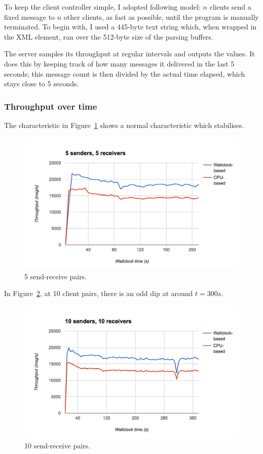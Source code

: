 To keep the client controller simple, I adopted following model: $n$ clients send a fixed message to $n$ other clients, as fast as possible, until the program is manually terminated. To begin with, I used a 445-byte text string which, when wrapped in the XML  element, ran over the 512-byte size of the parsing buffers.

The server samples its throughput at regular intervals and outputs the values. It does this by keeping track of how many messages it delivered in the last 5 seconds; this message count is then divided by the actual time elapsed, which stays close to 5 seconds.

\subsubsection{Throughput over time}
The characteristic in Figure~\ref{fig:5n5} shows a normal characteristic which stabilises.
\begin{figure}
  \centering\includegraphics[width=\textwidth]{../transcripts/lipsum/5n5/graph.png}
  \caption{5 send-receive pairs.}
  \label{fig:5n5}
\end{figure}

In Figure~\ref{fig:10n10}, at 10 client pairs, there is an odd dip at around $t=300s$.
\begin{figure}
  \centering\includegraphics[width=\textwidth]{../transcripts/lipsum/10n10/graph.png}
  \caption{10 send-receive pairs.}
  \label{fig:10n10}
\end{figure}

